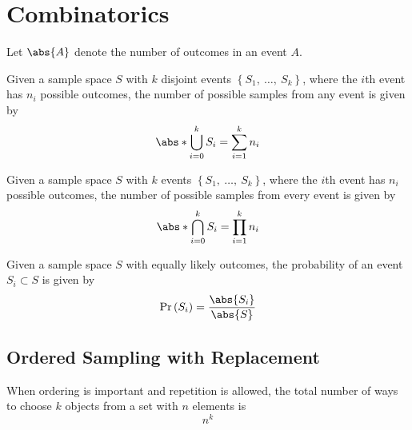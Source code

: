 \documentclass{article}
\begin{document}
\section{Combinatorics}
\begin{definition}
    Let \(\abs{A}\) denote the number of outcomes in an event \(A\).
\end{definition}
\begin{theorem}
    Given a sample space \(S\) with \(k\) disjoint events \({\left\{ S_1,\:\ldots,\:S_k \right\}}\),
    where the \(i\)th event has \(n_i\) possible outcomes,
    the number of possible samples from any event is given by
    \begin{equation*}
        \abs*{\bigcup_{i = 0}^{k} S_i} = \sum_{i = 1}^k n_i
    \end{equation*}
\end{theorem}
\begin{theorem}
    Given a sample space \(S\) with \(k\) events \({\left\{ S_1,\:\ldots,\:S_k \right\}}\),
    where the \(i\)th event has \(n_i\) possible outcomes,
    the number of possible samples from every event is given by
    \begin{equation*}
        \abs*{\bigcap_{i=0}^{k} S_i} = \prod_{i = 1}^k n_i
    \end{equation*}
\end{theorem}
\begin{theorem}
    Given a sample space \(S\) with equally likely outcomes, the probability
    of an event \(S_i \subset S\) is given by
    \begin{equation*}
        \Pr{\left( S_i \right)} = \frac{\abs{S_i}}{\abs{S}}
    \end{equation*}
\end{theorem}
\subsection{Ordered Sampling with Replacement}
When ordering is important and repetition is allowed, the total number
of ways to choose \(k\) objects from a set with \(n\) elements is
\begin{equation*}
    n^k
\end{equation*}
\end{document}
